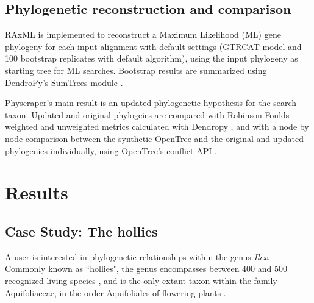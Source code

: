 \documentclass{bmcart}
\providecommand{\DIFaddtex}[1]{{\protect\color{blue}\uwave{#1}}} %
\providecommand{\DIFdeltex}[1]{{\protect\color{red}\sout{#1}}}                      %
\providecommand{\DIFaddbegin}{} %
\providecommand{\DIFaddend}{} %
\providecommand{\DIFdelbegin}{} %
\providecommand{\DIFdelend}{} %
\providecommand{\DIFadd}[1]{\texorpdfstring{\DIFaddtex{#1}}{#1}} %
\providecommand{\DIFdel}[1]{\texorpdfstring{\DIFdeltex{#1}}{}} %
\begin{document}
\subsection*{Phylogenetic reconstruction and comparison}

RAxML \cite{stamatakis2014raxml} is implemented to reconstruct a Maximum Likelihood
(ML) gene phylogeny for each input alignment with default settings (GTRCAT model and
100 bootstrap replicates with default algorithm), using the input phylogeny as starting
tree for ML searches.
Bootstrap results are summarized using DendroPy's SumTrees module
\cite{sukumaran2010dendropy}.

Physcraper's main result is an updated phylogenetic hypothesis for the search taxon.
Updated and original \DIFdelbegin \DIFdel{phylogeies }\DIFdelend \DIFaddbegin \DIFadd{phylogenies }\DIFaddend are compared with Robinson-Foulds weighted and unweighted
metrics calculated with Dendropy \cite{sukumaran2010dendropy}, and with a node by node
comparison between the synthetic OpenTree and the original and updated phylogenies individually,
using OpenTree's conflict API \cite{redelings2017supertree}.


\section*{Results}
\subsection*{Case Study: The hollies}

A user is interested in phylogenetic relationships within the genus \textit{Ilex}. Commonly
known as ``hollies", the genus encompasses between 400 \cite{gottlieb2005molecular}
and 500 recognized living species \cite{plantlist}, and is
the only extant taxon within the family Aquifoliaceae, in the order Aquifoliales of flowering
plants \cite{chase2016update}.
\end{document}
